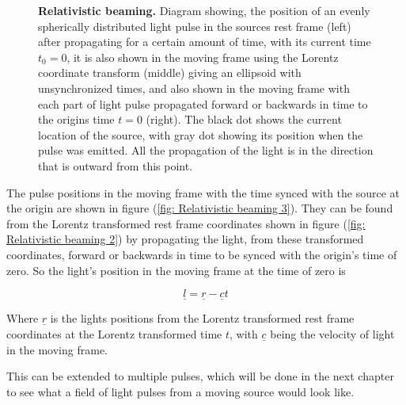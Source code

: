 \begin{figure}[H]
	\caption{\textbf{Relativistic beaming.} Diagram showing, the position of an evenly spherically distributed light pulse in the sources rest frame (left) after propagating for a certain amount of time, with its current time ${t_0}=0$, it is also shown in the moving frame using the Lorentz coordinate transform (middle) giving an ellipsoid with unsynchronized times, and also shown in the moving frame with each part of light pulse propagated forward or backwards in time to the origins time $t=0$ (right). The black dot shows the current location of the source, with gray dot showing its position when the pulse was emitted. All the propagation of the light is in the direction that is outward from this point.}
	\label{fig Relativistic beaming}
\end{figure}

The pulse positions in the moving frame with the time synced with the source at the origin are shown in figure (\ref{fig: Relativistic beaming 3}).
They can be found from the Lorentz transformed rest frame coordinates shown in figure (\ref{fig: Relativistic beaming 2}) by propagating the light, from these transformed coordinates, forward or backwards in time to be synced with the origin's time of zero.
So the light's position in the moving frame at the time of zero is

\begin{equation}
	\label{eq: synced time light}
	\underline{l} = \underline{r} - \underline{c} t
\end{equation}

Where $\underline{r}$ is the lights positions from the Lorentz transformed rest frame coordinates at the Lorentz transformed time $t$, with $\underline{c}$ being the velocity of light in the moving frame.

This can be extended to multiple pulses, which will be done in the next chapter to see what a field of light pulses from a moving source would look like.



